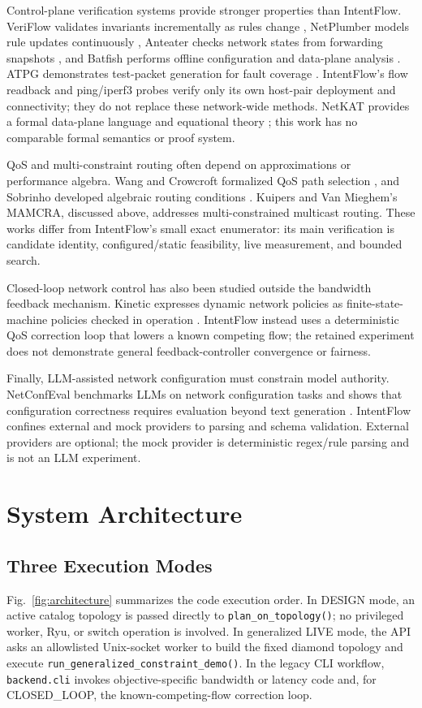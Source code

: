 \documentclass[conference]{IEEEtran}
\begin{document}
Control-plane verification systems provide stronger properties than IntentFlow.
VeriFlow validates invariants incrementally as rules change
\cite{khurshid2013veriflow}, NetPlumber models rule updates continuously
\cite{netplumber2013}, Anteater checks network states from forwarding
snapshots \cite{mai2011anteater}, and Batfish performs offline
configuration and data-plane analysis \cite{batfish2015}. ATPG demonstrates
test-packet generation for fault coverage \cite{zeng2012atpg}.
IntentFlow's flow readback and ping/iperf3 probes verify only its own host-pair
deployment and connectivity; they do not replace these network-wide methods.
NetKAT provides a formal data-plane language and equational theory
\cite{anderson2014netkat}; this work has no comparable formal semantics or
proof system.

QoS and multi-constraint routing often depend on approximations or performance
algebra. Wang and Crowcroft formalized QoS path selection
\cite{wang1996qos}, and Sobrinho developed algebraic routing conditions
\cite{sobrinho2001}. Kuipers and Van Mieghem's MAMCRA, discussed above,
addresses multi-constrained multicast routing. These works differ from
IntentFlow's small exact enumerator: its main verification is candidate
identity, configured/static feasibility, live measurement, and bounded search.

Closed-loop network control has also been studied outside the bandwidth
feedback mechanism. Kinetic expresses dynamic network policies as
finite-state-machine policies checked in operation \cite{kim2015kinetic}.
IntentFlow instead uses a deterministic QoS correction loop that lowers a
known competing flow; the retained experiment does not demonstrate general
feedback-controller convergence or fairness.

Finally, LLM-assisted network configuration must constrain model authority.
NetConfEval benchmarks LLMs on network configuration tasks and shows that
configuration correctness requires evaluation beyond text generation
\cite{wang2024netconfeval}. IntentFlow confines external and mock providers
to parsing and schema validation. External providers are optional; the mock
provider is deterministic regex/rule parsing and is not an LLM experiment.

\section{System Architecture}
\subsection{Three Execution Modes}
Fig.~\ref{fig:architecture} summarizes the code execution order. In
DESIGN mode, an active catalog topology is passed directly to
\texttt{plan\_on\_topology()}; no privileged worker, Ryu, or switch operation
is involved. In generalized LIVE mode, the API asks an allowlisted Unix-socket
worker to build the fixed diamond topology and execute
\texttt{run\_generalized\_constraint\_demo()}. In the legacy CLI workflow,
\texttt{backend.cli} invokes objective-specific bandwidth or latency code
and, for CLOSED\_LOOP, the known-competing-flow correction loop.
\end{document}
